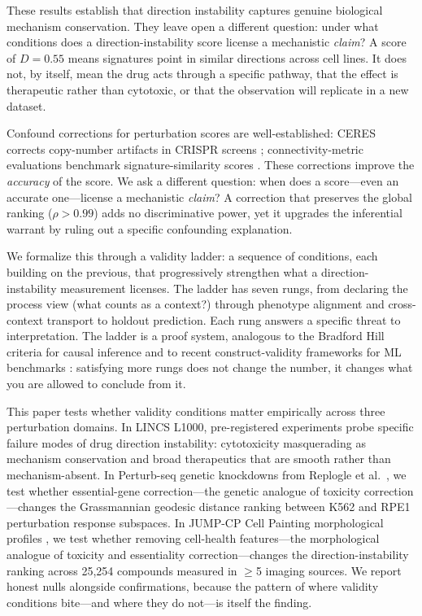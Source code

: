 \documentclass{article}
\begin{document}
These results establish that direction instability captures genuine biological
mechanism conservation. They leave open a different question: under what
conditions does a direction-instability score license a mechanistic \emph{claim}?
A score of $D = 0.55$ means signatures point in similar directions across cell
lines. It does not, by itself, mean the drug acts through a specific pathway,
that the effect is therapeutic rather than cytotoxic, or that the observation
will replicate in a new dataset.

Confound corrections for perturbation scores are well-established:
CERES corrects copy-number artifacts in CRISPR screens
\citep{meyers2017ceres}; connectivity-metric evaluations benchmark
signature-similarity scores \citep{li2020comprehensive}. These
corrections improve the \emph{accuracy} of the score. We ask a different
question: when does a score---even an accurate one---license a mechanistic
\emph{claim}? A correction that preserves the global ranking ($\rho > 0.99$)
adds no discriminative power, yet it upgrades the inferential warrant by
ruling out a specific confounding explanation.

We formalize this through a validity ladder: a sequence of conditions, each
building on the previous, that progressively strengthen what a
direction-instability measurement licenses. The ladder has seven rungs, from
declaring the process view (what counts as a context?) through phenotype
alignment and cross-context transport to holdout prediction. Each rung
answers a specific threat to interpretation. The ladder is a proof system,
analogous to the Bradford Hill criteria for causal inference and to recent
construct-validity frameworks for ML benchmarks
\citep{freiesleben2025benchmarking}: satisfying more rungs does not change
the number, it changes what you are allowed to conclude from it.

This paper tests whether validity conditions matter empirically across three
perturbation domains. In LINCS L1000, pre-registered experiments probe
specific failure modes of drug direction instability: cytotoxicity
masquerading as mechanism conservation and broad therapeutics that are
smooth rather than mechanism-absent. In Perturb-seq genetic knockdowns from
Replogle et al.\ \citep{replogle2022mapping}, we test whether essential-gene
correction---the genetic analogue of toxicity correction---changes the
Grassmannian geodesic distance ranking between K562 and RPE1 perturbation
response subspaces. In JUMP-CP Cell Painting morphological profiles
\citep{chandrasekaran2023jump}, we test whether removing cell-health
features---the morphological analogue of toxicity and essentiality
correction---changes the direction-instability ranking across 25{,}254
compounds measured in $\geq$5 imaging sources. We report honest nulls
alongside confirmations, because the pattern of where validity conditions
bite---and where they do not---is itself the finding.
\end{document}
